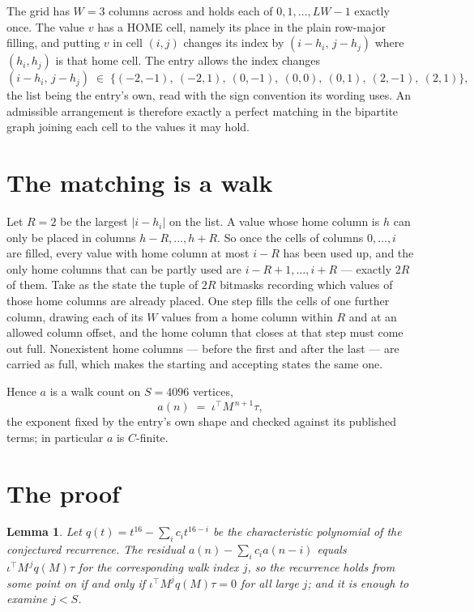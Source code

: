 \documentclass[11pt,a4paper]{article}
\theoremstyle{plain}
\newtheorem{lemma}[theorem]{Lemma}
\theoremstyle{definition}
\begin{document}
The grid has $W=3$ columns across and holds each of $0,1,\dots,LW-1$ exactly once. The value
$v$ has a HOME cell, namely its place in the plain row-major filling, and putting $v$ in cell
$(i,j)$ changes its index by $(i-h_i,\,j-h_j)$ where $(h_i,h_j)$ is that home cell. The entry
allows the index changes
\[
(i-h_i,\,j-h_j)\;\in\;\{(-2,-1),\ (-2,1),\ (0,-1),\ (0,0),\ (0,1),\ (2,-1),\ (2,1)\},
\]
the list being the entry's own, read with the sign convention its wording uses. An admissible
arrangement is therefore exactly a perfect matching in the bipartite graph joining each cell to
the values it may hold.

\section{The matching is a walk}

Let $R=2$ be the largest $|i-h_i|$ on the list. A value whose home column is $h$ can only be
placed in columns $h-R,\dots,h+R$. So once the cells of columns $0,\dots,i$ are filled, every
value with home column at most $i-R$ has been used up, and the only home columns that can be
partly used are $i-R+1,\dots,i+R$ --- exactly $2R$ of them. Take as the state the tuple of
$2R$ bitmasks recording which values of those home columns are already placed. One step fills
the cells of one further column, drawing each of its $W$ values from a home column within $R$
and at an allowed column offset, and the home column that closes at that step must come out
full. Nonexistent home columns --- before the first and after the last --- are carried as
full, which makes the starting and accepting states the same one.

Hence $a$ is a walk count on $S=4096$ vertices,
\[
a(n)\;=\;\iota^{\!\top}M^{\,n+1}\tau ,
\]
the exponent fixed by the entry's own shape and checked against its published terms; in
particular $a$ is $C$-finite.

\section{The proof}

\begin{lemma}\label{lem:crit}
Let $q(t)=t^{16}-\sum_i c_it^{16-i}$ be the characteristic polynomial of the
conjectured recurrence. The residual $a(n)-\sum_ic_ia(n-i)$ equals
$\iota^{\!\top}M^{\,j}q(M)\tau$ for the corresponding walk index $j$, so the recurrence
holds from some point on if and only if $\iota^{\!\top}M^{j}q(M)\tau=0$ for all large $j$;
and it is enough to examine $j<S$.
\end{lemma}
\end{document}
